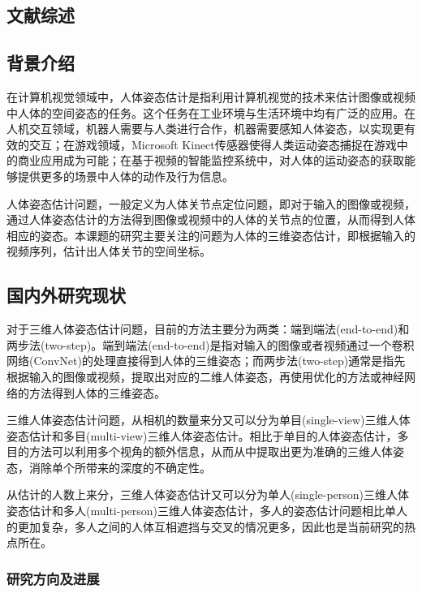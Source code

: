 \cleardoublepage
\begin{refsection}
\chapter{文献综述}

\section{背景介绍}
在计算机视觉领域中，人体姿态估计是指利用计算机视觉的技术来估计图像或视频中人体的空间姿态的任务。这个任务在工业环境与生活环境中均有广泛的应用。在人机交互领域，机器人需要与人类进行合作，机器需要感知人体姿态，以实现更有效的交互；在游戏领域，Microsoft Kinect传感器\autocite{shotton2013efficient}使得人类运动姿态捕捉在游戏中的商业应用成为可能；在基于视频的智能监控系统中，对人体的运动姿态的获取能够提供更多的场景中人体的动作及行为信息。

人体姿态估计问题，一般定义为人体关节点定位问题，即对于输入的图像或视频，通过人体姿态估计的方法得到图像或视频中的人体的关节点的位置，从而得到人体相应的姿态。本课题的研究主要关注的问题为人体的三维姿态估计，即根据输入的视频序列，估计出人体关节的空间坐标。


\section{国内外研究现状}
对于三维人体姿态估计问题，目前的方法主要分为两类：端到端法(end-to-end)\autocite{pavlakos2017coarse}和两步法(two-step)\autocite{zhou2016sparseness}。端到端法(end-to-end)\autocite{pavlakos2017coarse}是指对输入的图像或者视频通过一个卷积网络(ConvNet)的处理直接得到人体的三维姿态；而两步法(two-step)\autocite{zhou2016sparseness}通常是指先根据输入的图像或视频，提取出对应的二维人体姿态，再使用优化的方法或神经网络的方法得到人体的三维姿态。

三维人体姿态估计问题，从相机的数量来分又可以分为单目(single-view)三维人体姿态估计和多目(multi-view)三维人体姿态估计。相比于单目的人体姿态估计，多目的方法可以利用多个视角的额外信息，从而从中提取出更为准确的三维人体姿态，消除单个所带来的深度的不确定性。

从估计的人数上来分，三维人体姿态估计又可以分为单人(single-person)三维人体姿态估计和多人(multi-person)三维人体姿态估计，多人的姿态估计问题相比单人的更加复杂，多人之间的人体互相遮挡与交叉的情况更多，因此也是当前研究的热点所在。

\subsection{研究方向及进展}

\end{refsection}
